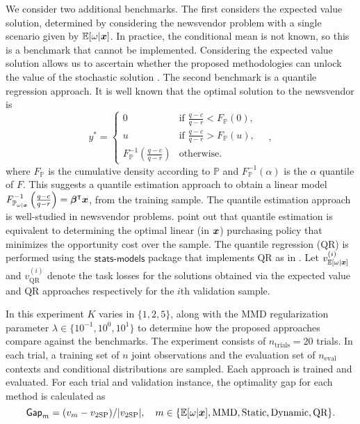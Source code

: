 We consider two additional benchmarks. The first considers the expected value solution, determined by considering the newsvendor problem with a single scenario given by $\mathbb{E}[\omega | \boldsymbol{x}]$. In practice, the conditional mean is not known, so this is a benchmark that cannot be implemented. Considering the expected value solution allows us to ascertain whether the proposed methodologies can unlock the value of the stochastic solution \citep{birge1982value}. The second benchmark is a quantile regression approach. It is well known that the optimal solution to the newsvendor is
$$
y^* = 
\begin{cases} 
0 & \text{if } \frac{q-c}{q-r} < F_{\mathbb{P}}(0), \\
u & \text{if } \frac{q-c}{q-r} > F_{\mathbb{P}}(u), \\
F_{\mathbb{P}}^{-1}\left( \frac{q-c}{q-r} \right) & \text{otherwise}. 
\end{cases}\quad , 
$$
where  $F_{\mathbb{P}}$ is the cumulative density according to $\mathbb{P}$ and $F^{-1}_{\mathbb{P}}(\alpha)$ is the $\alpha$ quantile of $F$. This suggests a quantile estimation approach to obtain a linear model \hbox{$F_{\mathbb{P}_{\omega|\boldsymbol{x}}}^{-1}\left( \frac{q-c}{q-r} \right) = \boldsymbol{\beta}^{\intercal} \boldsymbol{x}$}, from the training sample. The quantile estimation approach is well-studied in newsvendor problems. \citet{liu2022newsvendor} point out that quantile estimation is equivalent to determining the optimal linear (in $\boldsymbol{x}$) purchasing policy that minimizes the opportunity cost over the sample. The quantile regression (QR) is performed using the $\textsf{stats-models}$ package \citep{seabold2010statsmodels} that implements QR as in \citep{koenker2001quantile}. Let $v_{\mathbb{E}[\omega | \boldsymbol{x}]}^{(i)}$ and $v_{\text{QR}}^{(i)}$ denote the task losses for the solutions obtained via the expected value and QR approaches respectively for the $i$th validation sample. 


In this experiment $K$ varies in $\{1,2,5\}$, along with the MMD regularization parameter $\lambda \in \{10^{-1}, 10^{0}, 10^{1}\}$ to determine how the proposed approaches compare against the benchmarks. The experiment consists of $n_{\text{trials}} = 20$ trials. In each trial, a training set of $n$ joint observations and the evaluation set of $n_{\text{eval}}$ contexts and conditional distributions are sampled. Each approach is trained and evaluated. For each trial and validation instance, the optimality gap for each method is calculated as
$$
\textsf{Gap}_{m} = (v_{m} - v_{\text{2SP}})/|v_{\text{2SP}}|, \quad m \in \{\mathbb{E}[\omega | \boldsymbol{x}], \text{MMD}, \text{Static}, \text{Dynamic}, \text{QR} \}.
$$

